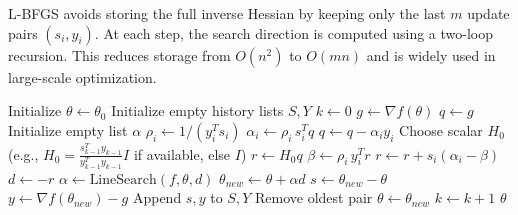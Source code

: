   \begin{algo}
    L-BFGS avoids storing the full inverse Hessian by keeping only the last $m$ update pairs $(s_i, y_i)$. 
    At each step, the search direction is computed using a two-loop recursion. 
    This reduces storage from $O(n^2)$ to $O(mn)$ and is widely used in large-scale optimization.
    \begin{algorithm}[H]
    \label{alg:lbfgs}
    \begin{algorithmic}[1]

        \State Initialize $\theta \gets \theta_0$
        \State Initialize empty history lists $S, Y$
        \State $k \gets 0$
          \State $g \gets \nabla f(\theta)$
          \State $q \gets g$
          \State Initialize empty list $\alpha$
            \State $\rho_i \gets 1 / (y_i^T s_i)$
            \State $\alpha_i \gets \rho_i \, s_i^T q$
            \State $q \gets q - \alpha_i y_i$
          \EndFor
          \State Choose scalar $H_0$ (e.g., $H_0 = \frac{s_{k-1}^T y_{k-1}}{y_{k-1}^T y_{k-1}} I$ if available, else $I$)
          \State $r \gets H_0 q$
            \State $\beta \gets \rho_i \, y_i^T r$
            \State $r \gets r + s_i (\alpha_i - \beta)$
          \EndFor
          \State $d \gets -r$ 
          \State $\alpha \gets \text{LineSearch}(f, \theta, d)$
          \State $\theta_{new} \gets \theta + \alpha d$
          \State $s \gets \theta_{new} - \theta$
          \State $y \gets \nabla f(\theta_{new}) - g$
           
            \State Append $s, y$ to $S, Y$
              \State Remove oldest pair
            \EndIf
          \EndIf
          \State $\theta \gets \theta_{new}$
          \State $k \gets k + 1$
        \EndWhile
        \State \Return $\theta$
      \EndProcedure
    \end{algorithmic}
    \end{algorithm}
  \end{algo}

